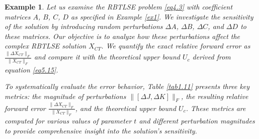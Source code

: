 \documentclass[preprint,11pt,3p]{elsarticle}
\newtheorem{example}[theorem]{Example}
\begin{document}
\begin{example}\label{ex1.1}
	Let us examine the RBTLSE problem \eqref{eq4.3} with coefficient matrices $A$, $B$, $C$, $D$ as specified in Example \ref{ex1}. We investigate the sensitivity of the solution by introducing random perturbations $\Delta A$, $\Delta B$, $\Delta C$, and $\Delta D$ to these matrices. Our objective is to analyze how these perturbations affect the complex RBTLSE solution $X_{CT}$. We quantify the exact relative forward error as $\frac{\|\Delta X_{CT}\|_F}{\|X_{CT}\|_F}$ and compare it with the theoretical upper bound $U_c$ derived from equation \eqref{eq5.15}.
	
	To systematically evaluate the error behavior, Table \ref{tab1.11} presents three key metrics: the magnitude of perturbations $\|[\Delta J, \Delta K]\|_F$, the resulting relative forward error $\frac{\|\Delta X_{CT}\|_F}{\|X_{CT}\|_F}$, and the theoretical upper bound $U_c$. These metrics are computed for various values of parameter $t$ and different perturbation magnitudes to provide comprehensive insight into the solution's sensitivity.
\end{example}
\end{document}
